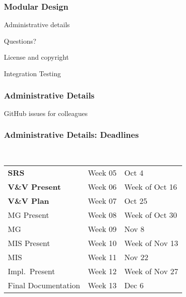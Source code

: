 \documentclass[t,12pt,numbers,fleqn]{beamer}
\begin{document}



\begin{frame}
\frametitle{Modular Design}

\bi
\item Administrative details
\item Questions?
\item License and copyright
\item Integration Testing %
\ei
\end{frame}


\begin{frame}
\frametitle{Administrative Details}

\bi
\item GitHub issues for colleagues
\ei

\end{frame}


\begin{frame}
\frametitle{Administrative Details: Deadlines}
~\newline
\begin{tabular}{l l l}
\textbf{SRS} & Week 05 & Oct 4\\
\textbf{V\&V Present} & Week 06 & Week of Oct 16\\
\textbf{V\&V Plan} & Week 07 & Oct 25\\
MG Present & Week 08 & Week of Oct 30\\
MG & Week 09 & Nov 8\\
MIS Present & Week 10 & Week of Nov 13\\
MIS & Week 11 & Nov 22\\
Impl.\ Present & Week 12 & Week of Nov 27\\
Final Documentation & Week 13 & Dec 6\\
\end {tabular}

\end{frame}

\end{document}
